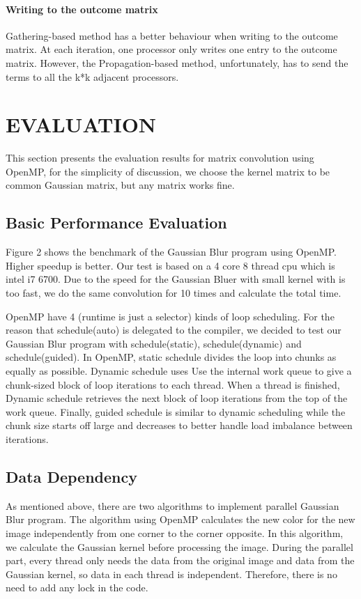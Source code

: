 \documentclass[letterpaper, 10 pt, conference]{ieeeconf}  %
\begin{document}
\paragraph{Writing to the outcome matrix}
Gathering-based method has a better behaviour when writing to the outcome matrix. At each iteration, one processor only writes one entry to the outcome matrix. However, the Propagation-based method, unfortunately, has to send the terms to all the k*k adjacent processors. 

\section{EVALUATION} 
This section presents the evaluation results for matrix convolution using OpenMP, for the simplicity of discussion, we choose the kernel matrix to be common Gaussian matrix, but any matrix works fine.
\subsection{Basic Performance Evaluation}
Figure 2 shows the benchmark of the Gaussian Blur program using OpenMP. Higher speedup is better. Our test is based on a 4 core 8 thread cpu which is intel i7 6700. Due to the speed for the Gaussian Bluer with small kernel with is too fast, we do the same convolution for 10 times and calculate the total time.


    OpenMP have 4 (runtime is just a selector) kinds of loop scheduling. For the reason that schedule(auto) is delegated to the compiler, we decided to test our Gaussian Blur program with schedule(static), schedule(dynamic) and schedule(guided). In OpenMP, static schedule divides the loop into chunks as equally as possible. Dynamic schedule uses Use the internal work queue to give a chunk-sized block of loop iterations to each thread. When a thread is finished, Dynamic schedule retrieves the next block of loop iterations from the top of the work queue. Finally, guided schedule is similar to dynamic scheduling while the chunk size starts off large and decreases to better handle load imbalance between iterations.
\subsection{Data Dependency}
As mentioned above, there are two algorithms to implement parallel Gaussian Blur program. The algorithm using OpenMP calculates the new color for the new image independently from one corner to the corner opposite. In this algorithm, we calculate the Gaussian kernel before processing the image. During the parallel part, every thread only needs the data from the original image and data from the Gaussian kernel, so data in each thread is independent. Therefore, there is no need to add any lock in the code.
\end{document}

